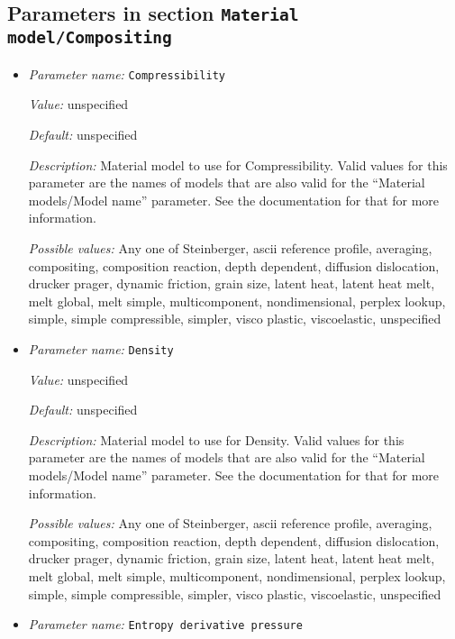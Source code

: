 \subsection{Parameters in section \tt Material model/Compositing}
\label{parameters:Material_20model/Compositing}

\begin{itemize}
\item {\it Parameter name:} {\tt Compressibility}
\label{parameters:Material model/Compositing/Compressibility}


{\it Value:} unspecified


{\it Default:} unspecified


{\it Description:} Material model to use for Compressibility. Valid values for this parameter are the names of models that are also valid for the ``Material models/Model name'' parameter. See the documentation for that for more information.


{\it Possible values:} Any one of Steinberger, ascii reference profile, averaging, compositing, composition reaction, depth dependent, diffusion dislocation, drucker prager, dynamic friction, grain size, latent heat, latent heat melt, melt global, melt simple, multicomponent, nondimensional, perplex lookup, simple, simple compressible, simpler, visco plastic, viscoelastic, unspecified
\item {\it Parameter name:} {\tt Density}
\label{parameters:Material model/Compositing/Density}


{\it Value:} unspecified


{\it Default:} unspecified


{\it Description:} Material model to use for Density. Valid values for this parameter are the names of models that are also valid for the ``Material models/Model name'' parameter. See the documentation for that for more information.


{\it Possible values:} Any one of Steinberger, ascii reference profile, averaging, compositing, composition reaction, depth dependent, diffusion dislocation, drucker prager, dynamic friction, grain size, latent heat, latent heat melt, melt global, melt simple, multicomponent, nondimensional, perplex lookup, simple, simple compressible, simpler, visco plastic, viscoelastic, unspecified
\item {\it Parameter name:} {\tt Entropy derivative pressure}
\label{parameters:Material model/Compositing/Entropy derivative pressure}



\end{itemize}
